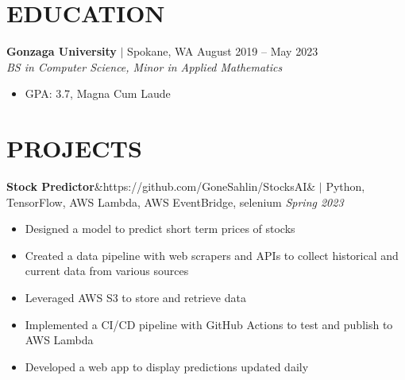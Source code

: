 \documentclass[11pt, a4paper, roman]{moderncv}
\newcommand{\project}[5]{
	\textbf{#1}\ifx&#2&{}
	\else
    		\href{#2}{\:\small\faGithub\:}\fi$|$ #3
	\hfill\textit{#4}
	#5
	\vspace{2mm}
}
\newcommand{\education}[5]{
	\textbf{#1} $|$ #2
	\hfill#3
	\\\textit{#4}
	#5
	\vspace{2mm}
}
\begin{document}
\vspace{4mm}
\linespread{2}
\maketitle
\linespread{1}
\vspace*{-12mm}


\section{EDUCATION}

\education{Gonzaga University}{Spokane, WA}{August 2019 -- May 2023}{BS in Computer Science, Minor in Applied Mathematics}
	{\begin{itemize}
    		\item GPA: 3.7, Magna Cum Laude
  	\end{itemize}
}

\vspace*{-2mm}
\section{PROJECTS}

{\project{Stock Predictor}{https://github.com/GoneSahlin/StocksAI}{Python, TensorFlow, AWS Lambda, AWS EventBridge, selenium}{Spring 2023}
	{\begin{itemize}
		\item Designed a model to predict short term prices of stocks
		\item Created a data pipeline with web scrapers and APIs to collect historical and current data from various sources
		\item Leveraged AWS S3 to store and retrieve data
		\item Implemented a CI/CD pipeline with GitHub Actions to test and publish to AWS Lambda
		\item Developed a web app to display predictions updated daily
	\end{itemize}}
}
\end{document}
